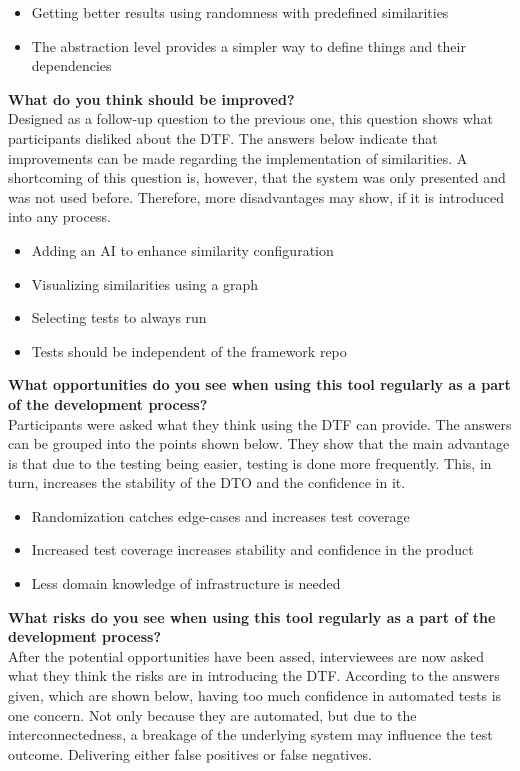 \begin{itemize}
    \item Getting better results using randomness with predefined similarities
    \item The abstraction level provides a simpler way to define things and their dependencies
\end{itemize}

\pagebreak

\textbf{What do you think should be improved?}\\
Designed as a follow-up question to the previous one, this question shows what participants disliked about the DTF.
The answers below indicate that improvements can be made regarding the implementation of similarities.
A shortcoming of this question is, however, that the system was only presented and was not used before.
Therefore, more disadvantages may show, if it is introduced into any process.

\begin{itemize}
    \item Adding an AI to enhance similarity configuration
    \item Visualizing similarities using a graph
    \item Selecting tests to always run
    \item Tests should be independent of the framework repo
\end{itemize}

\textbf{What opportunities do you see when using this tool regularly as a part of the development process?}\\
Participants were asked what they think using the DTF can provide.
The answers can be grouped into the points shown below.
They show that the main advantage is that due to the testing being easier, testing is done more frequently.
This, in turn, increases the stability of the DTO and the confidence in it.

\begin{itemize}
    \item Randomization catches edge-cases and increases test coverage
    \item Increased test coverage increases stability and confidence in the product
    \item Less domain knowledge of infrastructure is needed
\end{itemize}

\textbf{What risks do you see when using this tool regularly as a part of the development process?}\\
After the potential opportunities have been assed, interviewees are now asked what they think the risks are in introducing the DTF.
According to the answers given, which are shown below, having too much confidence in automated tests is one concern.
Not only because they are automated, but due to the interconnectedness, a breakage of the underlying system may influence the test outcome.
Delivering either false positives or false negatives.

